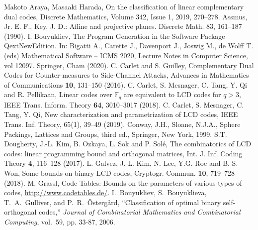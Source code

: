 \documentclass[a4paper,11pt]{article}
\begin{document}
\begin{thebibliography}{}
Makoto Araya, Masaaki Harada,
On the classification of linear complementary dual codes,
Discrete Mathematics, Volume 342, Issue 1, 2019, 270--278.
 Assmus, Jr. E. F., Key, J. D.: Affine and projective planes. Discrete Math. 83, 161--187 (1990).
I. Bouyukliev, The Program Generation in the Software Package QextNewEdition. In: Bigatti A., Carette J., Davenport J., Joswig M., de Wolff T. (eds) Mathematical Software -- ICMS 2020, Lecture Notes in Computer Science, vol 12097. Springer, Cham (2020).
C. Carlet and S. Guilley, Complementary Dual Codes for Counter-measures to Side-Channel Attacks, Advances in Mathematics of Communications \textbf{10}, 131--150 (2016).
C. Carlet, S. Mesnager, C. Tang, Y. Qi and R. Pellikaan, Linear codes
over $\mathbb{F}_q$ are equivalent to LCD codes for $q > 3$, IEEE Trans. Inform.
Theory \textbf{64}, 3010--3017 (2018).
C. Carlet, S. Mesnager, C. Tang, Y. Qi, New characterization and
parametrization of LCD codes, IEEE Trans. Inf. Theory, 65(1), 39--49 (2019).
Conway, J.H., Sloane, N.J.A., Sphere Packings, Lattices and Groups, third ed., Springer, New York, 1999.
S.T. Dougherty, J.-L. Kim, B. Ozkaya, L. Sok and P. Sol\'{e}, The combinatorics
of LCD codes: linear programming bound and orthogonal matrices, Int. J. Inf. Coding Theory \textbf{4}, 116--128 (2017).
L. Galvez, J.-L. Kim, N. Lee, Y.G. Roe and B.-S. Won, Some bounds
on binary LCD codes, Cryptogr. Commun. \textbf{10}, 719--728 (2018).
M. Grassl, Code Tables: Bounds on the parameters of various
types of codes, \url{http://www.codetables.de/}.
I.~Bouyukliev, S.~Bouyuklieva, T.~A.~Gulliver, and P.~R.~\"{O}sterg\aa rd,
  ``Classification of optimal binary self-orthogonal codes,'' \emph{Journal of
  Combinatorial Mathematics and Combinatorial Computing}, vol.~59, pp. 33-87,
  2006.

\end{thebibliography}
\end{document}
